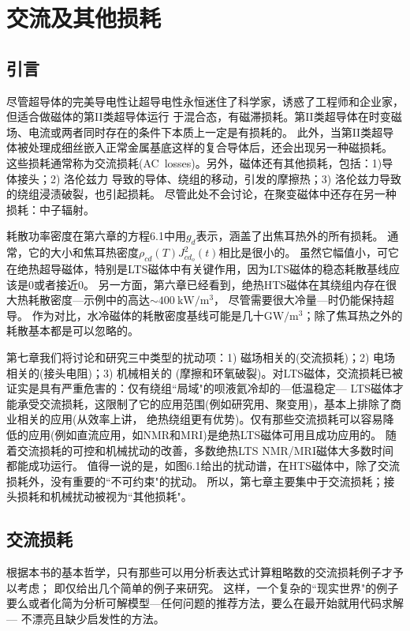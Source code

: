 \chapter{交流及其他损耗}
\section{引言}
尽管超导体的完美导电性让超导电性永恒迷住了科学家，诱惑了工程师和企业家，但适合做磁体的第II类超导体运行
于混合态，有磁滞损耗。第II类超导体在时变磁场、电流或两者同时存在的条件下本质上一定是有损耗的。
此外，当第II类超导体被处理成细丝嵌入正常金属基底这样的复合导体后，还会出现另一种磁损耗。
这些损耗通常称为交流损耗(AC~losses)。另外，磁体还有其他损耗，包括：1)导体接头；2) 洛伦兹力
导致的导体、绕组的移动，引发的摩擦热；3) 洛伦兹力导致的绕组浸渍破裂，也引起损耗。
尽管此处不会讨论，在聚变磁体中还存在另一种损耗：中子辐射。

耗散功率密度在第六章的方程6.1中用$g_d$表示，涵盖了出焦耳热外的所有损耗。
通常，它的大小和焦耳热密度$\rho_{cd}(T)J_{cd_o}^2(t)$相比是很小的。
虽然它幅值小，可它在绝热超导磁体，特别是LTS磁体中有关键作用，因为LTS磁体的稳态耗散基线应该是0或者接近0。
另一方面，第六章已经看到，绝热HTS磁体在其绕组内存在很大热耗散密度---示例中的高达$\sim 400\ \mathrm{kW/m^3}$，
尽管需要很大冷量---时仍能保持超导。
作为对比，水冷磁体的耗散密度基线可能是几十$\mathrm{GW/m^3}$；除了焦耳热之外的耗散基本都是可以忽略的。

第七章我们将讨论和研究三中类型的扰动项：1) 磁场相关的(交流损耗)；2) 电场相关的(接头电阻)；3) 机械相关的
(摩擦和环氧破裂)。对LTS磁体，交流损耗已被证实是具有严重危害的：仅有绕组``局域"的呗液氦冷却的---低温稳定---
LTS磁体才能承受交流损耗，这限制了它的应用范围(例如研究用、聚变用)，基本上排除了商业相关的应用(从效率上讲，
绝热绕组更有优势)。仅有那些交流损耗可以容易降低的应用(例如直流应用，如NMR和MRI)是绝热LTS磁体可用且成功应用的。
随着交流损耗的可控和机械扰动的改善，多数绝热LTS NMR/MRI磁体大多数时间都能成功运行。
值得一说的是，如图6.1给出的扰动谱，在HTS磁体中，除了交流损耗外，没有重要的``不可约束"的扰动。
所以，第七章主要集中于交流损耗；接头损耗和机械扰动被视为``其他损耗"。

\section{交流损耗}
根据本书的基本哲学，只有那些可以用分析表达式计算粗略数的交流损耗例子才予以考虑；
即仅给出几个简单的例子来研究。
这样，一个复杂的``现实世界"的例子要么或者化简为分析可解模型---任何问题的推荐方法，要么在最开始就用代码求解---
不漂亮且缺少启发性的方法。

